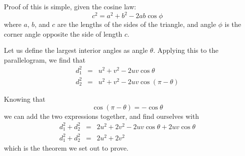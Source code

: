 \documentclass[12pt]{article}
\begin{document}
Proof of this is simple, given the cosine law:
\[
c^2 = a^2 + b^2 - 2ab\cos\phi
\]
where $a$, $b$, and $c$ are the lengths of the sides of the triangle, and angle $\phi$ is the corner angle opposite the side of length $c$.


Let us define the largest interior angles as angle $\theta$.
Applying this to the parallelogram, we find that
\begin{eqnarray*}
d_1^2 &=& u^2 + v^2 - 2uv\cos\theta\\
d_2^2 &=& u^2+v^2 - 2uv\cos\left(\pi-\theta\right)
\end{eqnarray*}
 


Knowing that
\[
\cos\left(\pi-\theta\right) = - \cos\theta
\]
we can add the two expressions together, and find ourselves with
\begin{eqnarray*}
d_1^2+d_2^2 &=& 2u^2 + 2v^2 - 2uv\cos\theta + 2uv\cos\theta\\
d_1^2+d_2^2 &=& 2u^2 + 2v^2
\end{eqnarray*}
which is the theorem we set out to prove.
\end{document}
